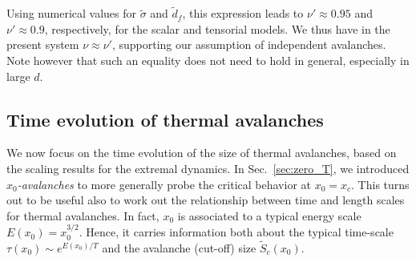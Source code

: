 \documentclass[pre,twocolumn,superscriptaddress,tightenlines,showpacs,longbibliography,floatfix,footinbib]{revtex4-1}
\newcommand{\mw}[1]{\textcolor{blue}{#1}}
\begin{document}
Using numerical values for $\tilde \sigma$ and  $\tilde d_f$, this expression leads to $\nu' \approx 0.95$ and $\nu'\approx 0.9$, respectively, for the scalar and tensorial models. We thus have in the present system $\nu\approx \nu'$, supporting our assumption of independent avalanches. Note however that  such an equality does not need to hold in general, especially in large $d$. 







\subsection{Time evolution of thermal avalanches}

We now focus on the time evolution of the size of thermal avalanches, based on the scaling results for the extremal dynamics. In Sec.~\ref{sec:zero_T}, we introduced {\it $x_0$-avalanches} to more generally probe the critical behavior at $x_0 = x_c$. This turns out to be useful also to work out the relationship between time and length scales for thermal avalanches. In fact, $x_0$ is associated to a typical energy scale $E(x_0)=x_0^{3/2}$. Hence, it carries information both about the typical time-scale  
$\tau(x_0) \sim e^{E(x_0)/T}$ and the avalanche (cut-off) size $\tilde S_c(x_0)$.
\end{document}
